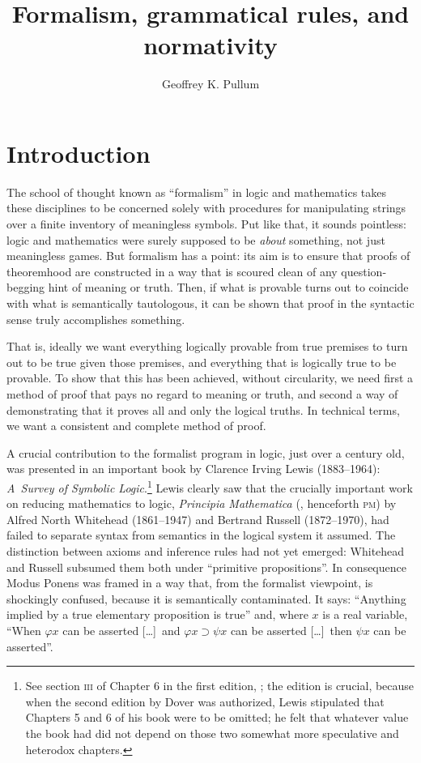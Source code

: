 \documentclass[output=paper]{langscibook}
\author{Geoffrey K. Pullum\affiliation{University of Edinburgh}}
\title{Formalism, grammatical rules, and normativity}
\begin{document}
\maketitle

\section{Introduction}
\label{sec:pullum:intro}

The school of thought known as ``formalism'' in logic and mathematics takes these disciplines to be concerned solely with procedures for manipulating strings over a finite inventory of meaningless symbols.  Put like that, it sounds pointless: logic and mathematics were surely supposed to be \emph{about} something, not just meaningless games. But formalism has a point: its aim is to ensure that proofs of theoremhood are constructed in a way that is scoured clean of any question-begging hint of meaning or truth.  Then, if what is provable turns out to coincide with what is semantically tautologous, it can be shown that proof in the syntactic sense truly accomplishes something.

That is, ideally we want everything logically provable from true premises to turn out to be true given those premises, and everything that is logically true to be provable. To show that this has been achieved, without circularity, we need first a method of proof that pays no regard to meaning or truth, and second a way of demonstrating that it proves all and only the logical truths. In technical terms, we want a consistent and complete method of proof.

A crucial contribution to the formalist program in logic, just over a century old, was presented in an important book by Clarence Irving Lewis (1883--1964): \textit{A~Survey of Symbolic Logic}.\footnote{See section \textsc{iii} of Chapter 6 in the first edition, \citeyear{Lewis18}; the edition is crucial, because when the second edition by Dover was authorized, Lewis stipulated that Chapters 5 and 6 of his book were to be omitted; he felt that whatever value the book had did not depend on those two somewhat more speculative and heterodox chapters.} Lewis clearly saw that the crucially important work on reducing mathematics to logic, \textit{Principia Mathematica} (\citeyear{WhitRussPM}, henceforth \textsc{pm}) by Alfred North Whitehead (1861--1947) and Bertrand Russell (1872--1970), had failed to separate syntax from semantics in the logical system it assumed. The distinction between axioms and inference rules had not yet emerged: Whitehead and Russell subsumed them both under ``primitive propositions''. In consequence Modus Ponens was framed in a way that, from the formalist viewpoint, is shockingly confused, because it is semantically contaminated. It says: ``Anything implied by a true elementary proposition is true'' and, where $x$ is a real variable, ``When $\varphi x$ can be asserted [\ldots]\ and $\varphi x \supset \psi x$ can be asserted [\ldots]\ then $\psi x$ can be asserted''.
\end{document}
